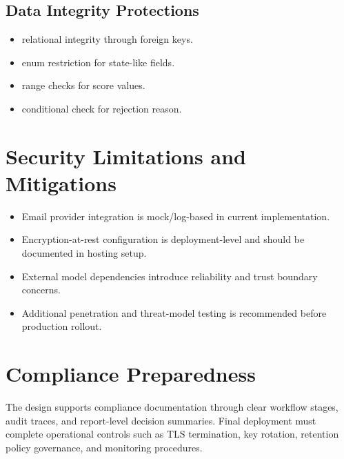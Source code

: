 \subsection{Data Integrity Protections}
\begin{itemize}
\item relational integrity through foreign keys.
\item enum restriction for state-like fields.
\item range checks for score values.
\item conditional check for rejection reason.
\end{itemize}

\section{Security Limitations and Mitigations}
\begin{itemize}
\item Email provider integration is mock/log-based in current implementation.
\item Encryption-at-rest configuration is deployment-level and should be documented in hosting setup.
\item External model dependencies introduce reliability and trust boundary concerns.
\item Additional penetration and threat-model testing is recommended before production rollout.
\end{itemize}

\section{Compliance Preparedness}
The design supports compliance documentation through clear workflow stages, audit traces, and report-level decision summaries. Final deployment must complete operational controls such as TLS termination, key rotation, retention policy governance, and monitoring procedures.
